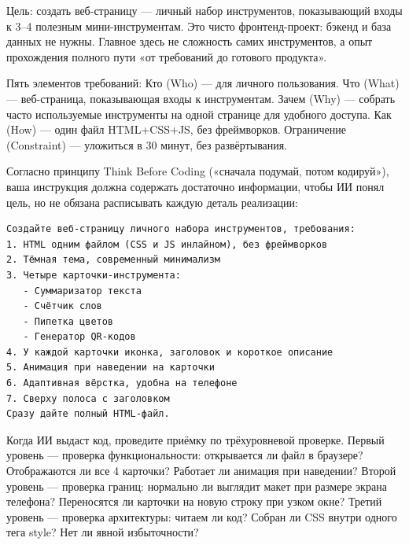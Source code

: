



Цель: создать веб-страницу — личный набор инструментов, показывающий входы к 3–4 полезным мини-инструментам. Это чисто фронтенд-проект: бэкенд и база данных не нужны. Главное здесь не сложность самих инструментов, а опыт прохождения полного пути «от требований до готового продукта».

Пять элементов требований: Кто (Who) — для личного пользования. Что (What) — веб-страница, показывающая входы к инструментам. Зачем (Why) — собрать часто используемые инструменты на одной странице для удобного доступа. Как (How) — один файл HTML+CSS+JS, без фреймворков. Ограничение (Constraint) — уложиться в 30 минут, без развёртывания.


Согласно принципу Think Before Coding («сначала подумай, потом кодируй»), ваша инструкция должна содержать достаточно информации, чтобы ИИ понял цель, но не обязана расписывать каждую деталь реализации:

\begin{lstlisting}
Создайте веб-страницу личного набора инструментов, требования:
1. HTML одним файлом (CSS и JS инлайном), без фреймворков
2. Тёмная тема, современный минимализм
3. Четыре карточки-инструмента:
   - Суммаризатор текста
   - Счётчик слов
   - Пипетка цветов
   - Генератор QR-кодов
4. У каждой карточки иконка, заголовок и короткое описание
5. Анимация при наведении на карточки
6. Адаптивная вёрстка, удобна на телефоне
7. Сверху полоса с заголовком
Сразу дайте полный HTML-файл.
\end{lstlisting}


Когда ИИ выдаст код, проведите приёмку по трёхуровневой проверке. Первый уровень — проверка функциональности: открывается ли файл в браузере? Отображаются ли все 4 карточки? Работает ли анимация при наведении? Второй уровень — проверка границ: нормально ли выглядит макет при размере экрана телефона? Переносятся ли карточки на новую строку при узком окне? Третий уровень — проверка архитектуры: читаем ли код? Собран ли CSS внутри одного тега style? Нет ли явной избыточности?

